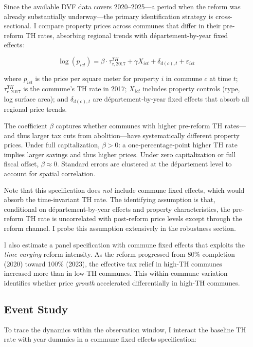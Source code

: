 \documentclass[12pt]{article}
\begin{document}
Since the available DVF data covers 2020--2025---a period when the reform was already substantially underway---the primary identification strategy is cross-sectional. I compare property prices across communes that differ in their pre-reform TH rates, absorbing regional trends with d\'epartement-by-year fixed effects:

\begin{equation}
    \log(p_{ict}) = \beta \cdot \tau^{TH}_{c,2017} + \gamma X_{ict} + \delta_{d(c),t} + \varepsilon_{ict}
    \label{eq:main}
\end{equation}

where $p_{ict}$ is the price per square meter for property $i$ in commune $c$ at time $t$; $\tau^{TH}_{c,2017}$ is the commune's TH rate in 2017; $X_{ict}$ includes property controls (type, log surface area); and $\delta_{d(c),t}$ are d\'epartement-by-year fixed effects that absorb all regional price trends.

The coefficient $\beta$ captures whether communes with higher pre-reform TH rates---and thus larger tax cuts from abolition---have systematically different property prices. Under full capitalization, $\beta > 0$: a one-percentage-point higher TH rate implies larger savings and thus higher prices. Under zero capitalization or full fiscal offset, $\beta \approx 0$. Standard errors are clustered at the d\'epartement level to account for spatial correlation.

Note that this specification does \emph{not} include commune fixed effects, which would absorb the time-invariant TH rate. The identifying assumption is that, conditional on d\'epartement-by-year effects and property characteristics, the pre-reform TH rate is uncorrelated with post-reform price levels except through the reform channel. I probe this assumption extensively in the robustness section.

I also estimate a panel specification with commune fixed effects that exploits the \emph{time-varying} reform intensity. As the reform progressed from 80\% completion (2020) toward 100\% (2023), the effective tax relief in high-TH communes increased more than in low-TH communes. This within-commune variation identifies whether price \emph{growth} accelerated differentially in high-TH communes.

\subsection{Event Study}

To trace the dynamics within the observation window, I interact the baseline TH rate with year dummies in a commune fixed effects specification:
\end{document}
